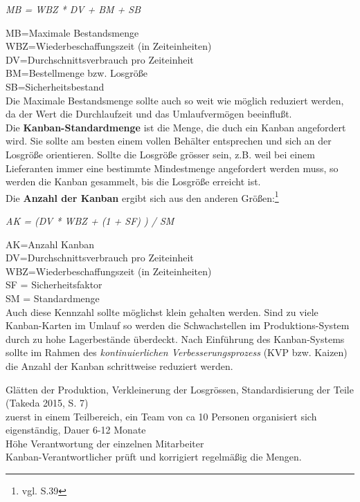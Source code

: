 \centerline{\textit{MB = WBZ * DV + BM + SB}}
 MB=Maximale Bestandsmenge\\
 WBZ=Wiederbeschaffungszeit (in Zeiteinheiten)\\
 DV=Durchschnittsverbrauch pro Zeiteinheit\\
 BM=Bestellmenge bzw. Losgröße\\
 SB=Sicherheitsbestand\\
Die Maximale Bestandsmenge sollte auch so weit wie möglich reduziert werden, da der Wert die Durchlaufzeit und das Umlaufvermögen beeinflußt.\\

Die \textbf{Kanban-Standardmenge} ist die Menge, die duch ein Kanban angefordert wird.
Sie sollte am besten einem vollen Behälter entsprechen und sich an der Losgröße orientieren.
Sollte die Losgröße grösser sein, z.B. weil bei einem Lieferanten immer eine bestimmte Mindestmenge angefordert werden muss, 
so werden die Kanban gesammelt, bis die Losgröße erreicht ist.\\

Die \textbf{Anzahl der Kanban} ergibt sich aus den anderen Größen:\footnote{vgl. \cite{Geiger2011Kanban} S.39}

\centerline{\textit{AK = (DV * WBZ + (1 + SF) ) / SM}}

 AK=Anzahl Kanban\\
 DV=Durchschnittsverbrauch pro Zeiteinheit\\
 WBZ=Wiederbeschaffungszeit (in Zeiteinheiten)\\
 SF = Sicherheitsfaktor\\
 SM = Standardmenge\\
Auch diese Kennzahl sollte möglichst klein gehalten werden. Sind zu viele Kanban-Karten im Umlauf so 
werden die Schwachstellen im Produktions-System durch zu hohe Lagerbestände überdeckt.
Nach Einführung des Kanban-Systems sollte im Rahmen des \textit{kontinuierlichen Verbesserungsprozess} (KVP bzw. Kaizen) 
die Anzahl der Kanban schrittweise reduziert werden. 

Glätten der Produktion, Verkleinerung der Losgrössen, Standardisierung der Teile (Takeda 2015, S. 7)\\
zuerst in einem Teilbereich, ein Team von ca 10 Personen organisiert sich eigenständig, Dauer 6-12 Monate\\
Höhe Verantwortung der einzelnen Mitarbeiter\\
Kanban-Verantwortlicher prüft und korrigiert regelmäßig die Mengen.\\

